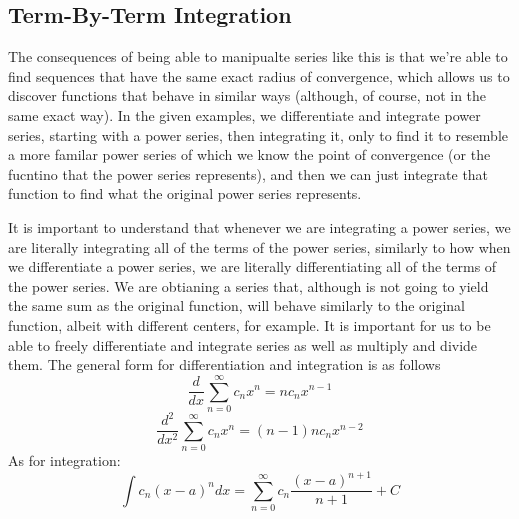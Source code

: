 \subsection{Term-By-Term Integration}
\begin{center}
\end{center}
  The consequences of being able to manipualte series like this is that
  we're able to find sequences that have the same exact radius of
  convergence, which allows us to discover functions that
  behave in similar ways (although, of course, not
  in the same exact way). In the given examples, we
  differentiate and integrate power series, starting with
  a power series, then integrating it, only to find it
  to resemble a more familar power series of which
  we know the point of convergence (or the fucntino that
  the power series represents), and then we can just
  integrate that function to find what the original
  power series represents.
  \par It is important to understand that whenever
  we are integrating a power series, we are
  literally integrating all of the terms of
  the power series, similarly to how when
  we differentiate a power series, we are
  literally differentiating all of the terms
  of the power series. We are obtianing
  a series that, although is not going
  to yield the same sum as the original
  function, will behave similarly to the
  original function, albeit with different
  centers, for example. It is important
  for us to be able to freely differentiate
  and integrate series as well as multiply and
  divide them.
  The general form for differentiation and
  integration is as follows
  \[ \frac{d}{dx} \sum_{n=0}^{\infty} c_{n}x^{n} = nc_{n}x^{n-1}\]
  \[ \frac{d^{2}}{dx^{2}} \sum_{n=0}^{\infty} c_{n}x^{n} = (n-1)nc_{n}x^{n-2}\]
  As for integration:
  \[ \int c_{n}(x-a)^{n} dx  = \sum_{n=0}^{\infty} c_{n} \frac{(x-a)^{n+1}}{n+1} + C \]

